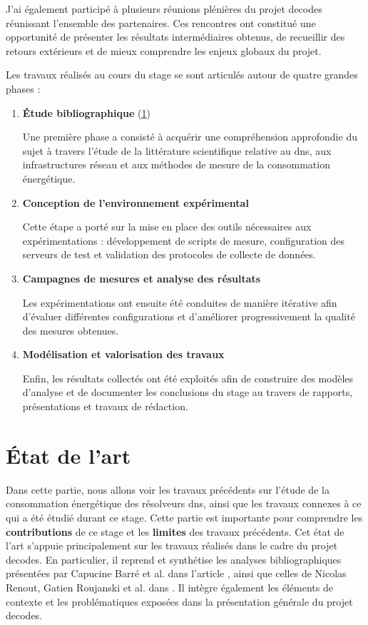 \documentclass[12pt, a4paper]{report}
\begin{document}
	J'ai également participé à plusieurs réunions plénières du projet \gls{decodes} réunissant l'ensemble des partenaires. Ces rencontres ont constitué une opportunité de présenter les résultats intermédiaires obtenus, de recueillir des retours extérieurs et de mieux comprendre les enjeux globaux du projet.

	Les travaux réalisés au cours du stage se sont articulés autour de quatre grandes phases :

	\begin{enumerate}
		\item \textbf{Étude bibliographique} (\ref{sec:etat_de_lart})

		Une première phase a consisté à acquérir une compréhension approfondie du sujet à travers l'étude de la littérature scientifique relative au \gls{dns}, aux infrastructures réseau et aux méthodes de mesure de la consommation énergétique.

		\item \textbf{Conception de l'environnement expérimental}

		Cette étape a porté sur la mise en place des outils nécessaires aux expérimentations : développement de scripts de mesure, configuration des serveurs de test et validation des protocoles de collecte de données.

		\item \textbf{Campagnes de mesures et analyse des résultats}

		Les expérimentations ont ensuite été conduites de manière itérative afin d'évaluer différentes configurations et d'améliorer progressivement la qualité des mesures obtenues.

		\item \textbf{Modélisation et valorisation des travaux}

		Enfin, les résultats collectés ont été exploités afin de construire des modèles d'analyse et de documenter les conclusions du stage au travers de rapports, présentations et travaux de rédaction.

	\end{enumerate}


	\section{État de l'art}
	\label{sec:etat_de_lart}

	Dans cette partie, nous allons voir les travaux précédents sur l'étude de la consommation énergétique des résolveurs \gls{dns}, ainsi que les travaux connexes à ce qui a été étudié durant ce stage. Cette partie est importante pour comprendre les \textbf{contributions} de ce stage et les \textbf{limites} des travaux précédents. Cet état de l'art s'appuie principalement sur les travaux réalisés dans le cadre du projet \gls{decodes}. En particulier, il reprend et synthétise les analyses bibliographiques présentées par Capucine Barré et al. dans l'article \cite{barre2026dns_cpu}, ainsi que celles de Nicolas Renout, Gatien Roujanski et al. dans \cite{renout2026dns_analysis}. Il intègre également les éléments de contexte et les problématiques exposées dans la présentation générale du projet \gls{decodes}. 
\end{document}
